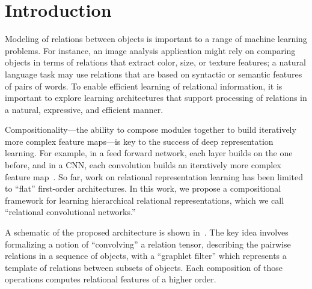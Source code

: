\section{Introduction}\label{sec:intro}

Modeling of relations between objects is important to a range of machine learning problems. For instance, an image analysis application might rely on comparing objects in terms of relations that extract color, size, or texture features; a natural language task may use relations that are based on syntactic or semantic features of pairs of words. To enable efficient learning of relational information, it is important to explore learning architectures that support processing of relations in a natural, expressive, and efficient manner. %

Compositionality---the ability to compose modules together to build iteratively more complex feature maps---is key to the success of deep representation learning. For example, in a feed forward network, each layer builds on the one before, and in a CNN, each convolution builds an iteratively more complex feature map~\citep{zeiler2014visualizing}. So far, work on relational representation learning has been limited to ``flat'' first-order architectures. In this work, we propose a compositional framework for learning hierarchical relational representations, which we call ``relational convolutional networks.''

A schematic of the proposed architecture is shown in~. The key idea involves formalizing a notion of ``convolving'' a relation tensor, describing the pairwise relations in a sequence of objects, with a ``graphlet filter'' which represents a template of relations between subsets of objects. Each composition of those operations computes relational features of a higher order.


